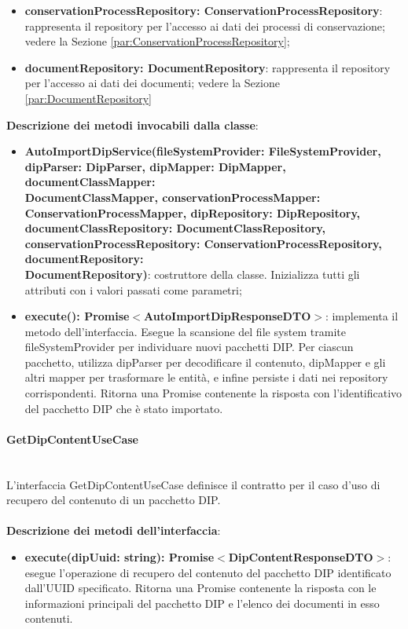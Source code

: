 \documentclass[a4paper,12pt]{article}
\begin{document}
{{{\begin{itemize}
                    \item \textbf{conservationProcessRepository: ConservationProcessRepository}: rappresenta il repository per l'accesso ai dati dei processi di conservazione; vedere la Sezione \ref{par:ConservationProcessRepository};
                    \item \textbf{documentRepository: DocumentRepository}: rappresenta il repository per l'accesso ai dati dei documenti; vedere la Sezione \ref{par:DocumentRepository} 
                \end{itemize}
                
              \noindent \textbf{Descrizione dei metodi invocabili dalla classe}:
                \begin{itemize}
                    \item \textbf{AutoImportDipService(fileSystemProvider: FileSystemProvider, dipParser: DipParser, dipMapper: DipMapper, documentClassMapper:\\ DocumentClassMapper, conservationProcessMapper:\\ ConservationProcessMapper, dipRepository: DipRepository,\\ documentClassRepository: DocumentClassRepository, conservationProcessRepository: ConservationProcessRepository, documentRepository:\\ DocumentRepository)}: costruttore della classe. Inizializza tutti gli attributi con i valori passati come parametri;
                    \item \textbf{execute(): Promise$<$AutoImportDipResponseDTO$>$}: implementa il metodo dell'interfaccia. Esegue la scansione del file system tramite fileSystemProvider per individuare nuovi pacchetti DIP. Per ciascun pacchetto, utilizza dipParser per decodificare il contenuto, dipMapper e gli altri mapper per trasformare le entità, e infine persiste i dati nei repository corrispondenti. Ritorna una Promise contenente la risposta con l’identificativo del pacchetto DIP che è stato importato.
                \end{itemize}
                \paragraph{GetDipContentUseCase}\label{par:GetDipContentUseCase}\mbox{}\\
                L'interfaccia GetDipContentUseCase definisce il contratto per il caso d'uso di recupero del contenuto di un pacchetto DIP.\\
                \\
              \noindent \textbf{Descrizione dei metodi dell'interfaccia}:
                \begin{itemize}
                    \item \textbf{execute(dipUuid: string): Promise$<$DipContentResponseDTO$>$}: esegue l'operazione di recupero del contenuto del pacchetto DIP identificato dall'UUID specificato. Ritorna una Promise contenente la risposta con le informazioni principali del pacchetto DIP e l’elenco dei documenti in esso contenuti.
                \end{itemize}
}}}
\end{document}
